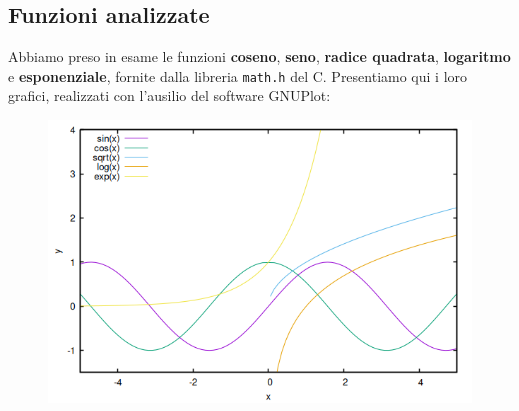 \documentclass{article}
\begin{document}
\subsection{Funzioni analizzate}
Abbiamo preso in esame le funzioni \textbf{coseno}, \textbf{seno}, \textbf{radice quadrata}, \textbf{logaritmo} e \textbf{esponenziale}, fornite dalla libreria 
\texttt{math.h} del C. Presentiamo qui i loro grafici, realizzati con l'ausilio del software GNUPlot:
\begin{figure}[h]
   \centering
   \includegraphics*[scale=.5]{../grafici/immagini/funzioni.png}
\end{figure}
\end{document}
